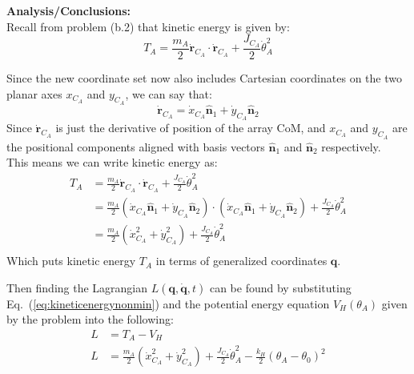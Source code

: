 \documentclass[titlepage]{article}
\begin{document}
\textbf{Analysis/Conclusions:}\\
Recall from problem (b.2) that kinetic energy is given by:
\begin{equation}
	T_A=\frac{m_A}{2}\dot{\boldsymbol{r}}_{C_A}\cdot\dot{\boldsymbol{r}}_{C_A}+\frac{J_{C_A}}{2}\dot{\theta}_A^2
\end{equation}

Since the new coordinate set now also includes Cartesian coordinates on the two planar axes $x_{C_A}$ and $y_{C_A}$, we can say that:
\begin{equation}
	\dot{\boldsymbol{r}}_{C_A}=\dot{x}_{C_A}\hat{\boldsymbol{n}}_1+\dot{y}_{C_A}\hat{\boldsymbol{n}}_2
\end{equation}
Since $\dot{\boldsymbol{r}}_{C_A}$ is just the derivative of position of the array CoM, and $x_{C_A}$ and $y_{C_A}$ are the positional components aligned with basis vectors $\hat{\boldsymbol{n}}_1$ and $\hat{\boldsymbol{n}}_2$ respectively.\\

This means we can write kinetic energy as:
\begin{equation}
	\begin{split}
		T_A&=\frac{m_A}{2}\dot{\boldsymbol{r}}_{C_A}\cdot\dot{\boldsymbol{r}}_{C_A}+\frac{J_{C_A}}{2}\dot{\theta}_A^2 \\
		&=\frac{m_A}{2}\left(\dot{x}_{C_A}\hat{\boldsymbol{n}}_1+\dot{y}_{C_A}\hat{\boldsymbol{n}}_2\right)\cdot\left(\dot{x}_{C_A}\hat{\boldsymbol{n}}_1+\dot{y}_{C_A}\hat{\boldsymbol{n}}_2\right)+\frac{J_{C_A}}{2}\dot{\theta}_A^2 \\
		&=\frac{m_A}{2}\left(\dot{x}_{C_A}^2+\dot{y}_{C_A}^2\right)+\frac{J_{C_A}}{2}\dot{\theta}_A^2 \\
	\end{split}
	\label{eq:kineticenergynonmin}
\end{equation}
Which puts kinetic energy $T_A$ in terms of generalized coordinates $\boldsymbol{q}$.\\

\newpage

\begin{mdframed}[linewidth=1pt, innertopmargin=10pt, innerbottommargin=10pt]
	Then finding the Lagrangian $L(\boldsymbol{q},\dot{\boldsymbol{q}},t)$ can be found by substituting Eq.~(\ref{eq:kineticenergynonmin}) and the potential energy equation $V_H(\theta_A)$ given by the problem into the following:
	\begin{equation}
		\begin{split}
			L&=T_A-V_H \\
			L&=\frac{m_A}{2}\left(\dot{x}_{C_A}^2+\dot{y}_{C_A}^2\right)+\frac{J_{C_A}}{2}\dot{\theta}_A^2-\frac{k_H}{2}(\theta_A-\theta_0)^2 \\
		\end{split}
	\end{equation}
\end{mdframed}
\end{document}
